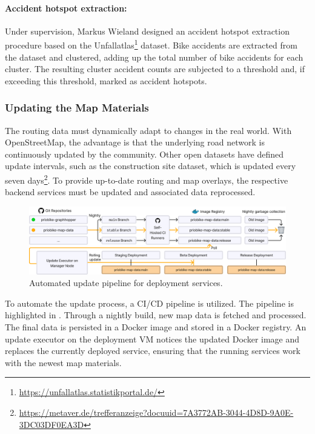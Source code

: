 \paragraph{Accident hotspot extraction:} Under supervision, Markus Wieland \cite{wieland_2022} designed an accident hotspot extraction procedure based on the Unfallatlas\footnote{\url{https://unfallatlas.statistikportal.de/}} dataset. Bike accidents are extracted from the dataset and clustered, adding up the total number of bike accidents for each cluster. The resulting cluster accident counts are subjected to a threshold and, if exceeding this threshold, marked as accident hotspots.

\subsubsection{Updating the Map Materials} 

The routing data must dynamically adapt to changes in the real world. With OpenStreetMap, the advantage is that the underlying road network is continuously updated by the community. Other open datasets have defined update intervals, such as the construction site dataset, which is updated every seven days\footnote{\url{https://metaver.de/trefferanzeige?docuuid=7A3772AB-3044-4D8D-9A0E-3DC03DF0EA3D}}. To provide up-to-date routing and map overlays, the respective backend services must be updated and associated data reprocessed. 

\begin{figure}[htbp]
\centering
\includegraphics[width=\linewidth]{images/multi-stage-continuous-deployment.png}
\caption{Automated update pipeline for deployment services.}
\label{fig:multi-stage-continuous-deployment}
\end{figure}

To automate the update process, a CI/CD pipeline is utilized. The pipeline is highlighted in . Through a nightly build, new map data is fetched and processed. The final data is persisted in a Docker image and stored in a Docker registry. An update executor on the deployment VM notices the updated Docker image and replaces the currently deployed service, ensuring that the running services work with the newest map materials.

